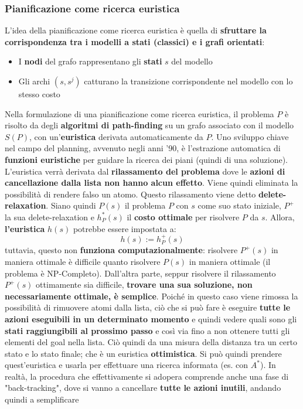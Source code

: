\documentclass[12pt]{article}
\begin{document}
\subsubsection{Pianificazione come ricerca euristica}
L'idea della pianificazione come ricerca euristica è quella di \textbf{sfruttare la corrispondenza tra i modelli a stati (classici) e i grafi orientati}:
\begin{itemize}
    \item I \textbf{nodi} del grafo rappresentano gli \textbf{stati} $s$ del modello
    \item Gli archi $(s, s^j)$ catturano la transizione corrispondente nel modello con lo stesso costo
\end{itemize}
Nella formulazione di una pianificazione come ricerca euristica, il problema $P$ è risolto da degli \textbf{algoritmi di path-finding} su un grafo
associato con il modello $S(P)$, con un'\textbf{euristica} derivata automaticamente da $P$.
Uno sviluppo chiave nel campo del planning, avvenuto negli anni '90, è l'estrazione automatica di \textbf{funzioni euristiche} per guidare la ricerca dei piani (quindi di una soluzione).
L'euristica verrà derivata dal \textbf{rilassamento del problema} dove le \textbf{azioni di cancellazione dalla lista non hanno alcun effetto}. Viene quindi
eliminata la possibilità di rendere falso un atomo. Questo rilassamento viene detto \textbf{delete-relaxation}.
Siano quindi $P(s)$ il problema $P$ con $s$ come suo stato iniziale, $P^+$ la sua delete-relaxation e $h^*_P(s)$ il \textbf{costo ottimale} per risolvere $P$ da $s$.
Allora, \textbf{l'euristica} $h(s)$ potrebbe essere impostata a:
$$h(s) := h_P^+(s)$$
tuttavia, questo non \textbf{funziona computazionalmente}: risolvere $P^+(s)$ in maniera ottimale è difficile quanto risolvere $P(s)$ in maniera ottimale (il problema è NP-Completo).
Dall'altra parte, seppur risolvere il rilassamento $P^+(s)$ ottimamente sia difficile, \textbf{trovare una sua soluzione, non necessariamente ottimale, è semplice}.
Poiché in questo caso viene rimossa la possibilità di rimuovere atomi dalla lista, ciò che si può fare è eseguire \textbf{tutte le azioni eseguibili in un determinato momento} e quindi
vedere quali sono gli \textbf{stati raggiungibili al prossimo passo} e così via fino a non ottenere tutti gli elementi del goal nella lista.
Ciò quindi da una misura della distanza tra un certo stato e lo stato finale; che è un euristica \textbf{ottimistica}. Si può quindi prendere quest'euristica e usarla
per effettuare una ricerca informata (es. con $A^*$).
In realtà, la procedura che effettivamente si adopera comprende anche una fase di "back-tracking", dove si vanno a cancellare \textbf{tutte le azioni inutili}, andando quindi a semplificare
\end{document}
